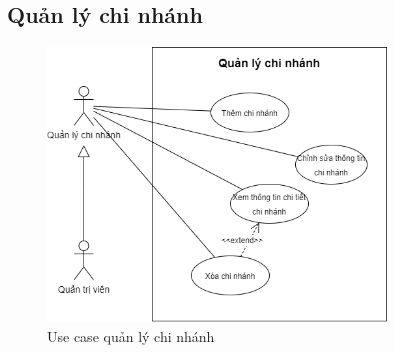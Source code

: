\newpage
\subsection{Quản lý chi nhánh}
\begin{figure}[!htp]
    \centering
    \includegraphics[width=9cm]{img/UseCase/UseCase-Quản lý chi nhánh.drawio.png}
    \newline
    \caption{Use case quản lý chi nhánh}
\end{figure}


